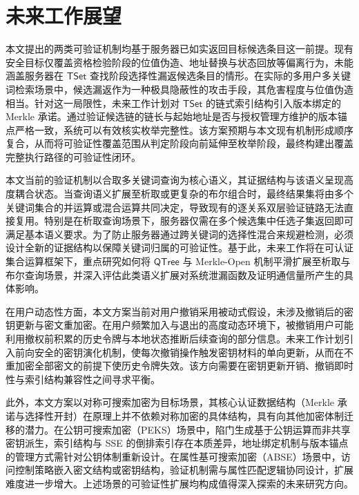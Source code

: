 \section{未来工作展望}

本文提出的两类可验证机制均基于服务器已如实返回目标候选条目这一前提。现有安全目标仅覆盖资格检验阶段的位值伪造、地址替换与状态回放等偏离行为，未能涵盖服务器在 $\mathsf{TSet}$ 查找阶段选择性漏返候选条目的情形。在实际的多用户多关键词检索场景中，候选漏返作为一种极具隐蔽性的攻击手段，其危害程度与位值伪造相当。针对这一局限性，未来工作计划对 $\mathsf{TSet}$ 的链式索引结构引入版本绑定的 Merkle 承诺。通过验证候选链的链长与起始地址是否与授权管理方维护的版本锚点严格一致，系统可以有效核实枚举完整性。该方案预期与本文现有机制形成顺序复合，从而将可验证性覆盖范围从判定阶段向前延伸至枚举阶段，最终构建出覆盖完整执行路径的可验证性闭环。

本文当前的验证机制以合取多关键词查询为核心语义，其证据结构与该语义呈现高度耦合状态。当查询语义扩展至析取或更复杂的布尔组合时，最终结果集将由多个关键词集合的并运算或混合运算共同决定，导致现有的逐关系双层验证链路无法直接复用。特别是在析取查询场景下，服务器仅需在多个候选集中任选子集返回即可满足基本语义要求。为了防止服务器通过跨关键词的选择性混合来规避检测，必须设计全新的证据结构以保障关键词归属的可验证性。基于此，未来工作将在可认证集合运算框架下，重点研究如何将 $\mathsf{QTree}$ 与 Merkle-Open 机制平滑扩展至析取与布尔查询场景，并深入评估此类语义扩展对系统泄漏函数及证明通信量所产生的具体影响。

在用户动态性方面，本文方案当前对用户撤销采用被动式假设，未涉及撤销后的密钥更新与密文重加密。在用户频繁加入与退出的高度动态环境下，被撤销用户可能利用撤权前积累的历史令牌与本地状态推断后续查询的部分信息。未来工作计划引入前向安全的密钥演化机制，使每次撤销操作触发密钥材料的单向更新，从而在不重加密全部密文的前提下使历史令牌失效。该方向需要在密钥更新开销、撤销即时性与索引结构兼容性之间寻求平衡。

此外，本文方案以对称可搜索加密为目标场景，其核心认证数据结构（Merkle 承诺与选择性开封）在原理上并不依赖对称加密的具体结构，具有向其他加密体制迁移的潜力。在公钥可搜索加密（PEKS）场景中，陷门生成基于公钥运算而非共享密钥派生，索引结构与 SSE 的倒排索引存在本质差异，地址绑定机制与版本锚点的管理方式需针对公钥体制重新设计。在属性基可搜索加密（ABSE）场景中，访问控制策略嵌入密文结构或密钥结构，验证机制需与属性匹配逻辑协同设计，扩展难度进一步增大。上述场景的可验证性扩展均构成值得深入探索的未来研究方向。
